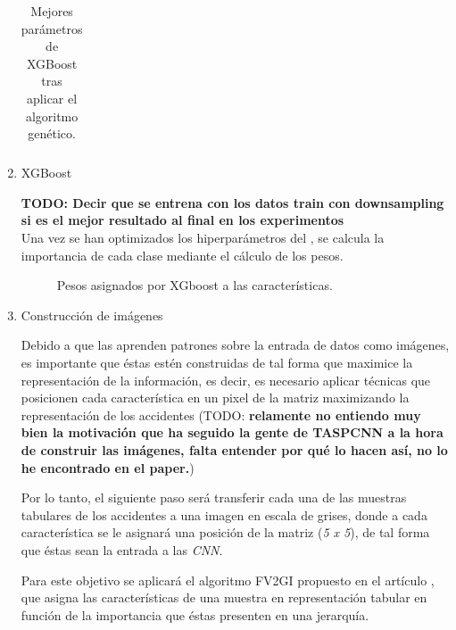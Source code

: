 \begin{enumerate}
\begin{table}[H]
\begin{tabular}{ |c|c| }
                    \end{tabular}
                \caption{Mejores parámetros de XGBoost tras aplicar el algoritmo genético.}
                \label{BestGASolutionTable}
            \end{table}



        \item XGBoost

            \textbf{TODO: Decir que se entrena con los datos train con downsampling si es el mejor resultado al final en los experimentos}\\

            Una vez se han optimizados los hiperparámetros del , se calcula la importancia de cada clase mediante el cálculo de los pesos. \cite{XGBoostFeatureWeightsMeaning}


            \begin{figure}[H]
                \centering
                
                \caption{Pesos asignados por XGboost a las características.}
                \label{FeatureWeightsImage}
             \end{figure}


        \item Construcción de imágenes


            Debido a que las  aprenden patrones sobre la entrada de datos como imágenes, es importante que éstas estén construidas de tal forma que maximice la representación de la información, es decir, es necesario aplicar técnicas que posicionen cada característica en un pixel de la matriz maximizando la representación de los accidentes (TODO: \textbf{relamente no entiendo muy bien la motivación que ha seguido la gente de TASPCNN a la hora de construir las imágenes, falta entender por qué lo hacen así, no lo he encontrado en el paper.})

            Por lo tanto, el siguiente paso será transferir cada una de las muestras tabulares de los accidentes a una imagen en escala de grises, donde a cada característica se le asignará una posición de la matriz (\textit{5 x 5}), de tal forma que éstas sean la entrada a las \textit{CNN}.

            Para este objetivo se aplicará el algoritmo FV2GI propuesto en el artículo \cite{TASPCNN}, que asigna las características de una muestra en representación tabular en función de la importancia que éstas presenten en una jerarquía.


\end{enumerate}
